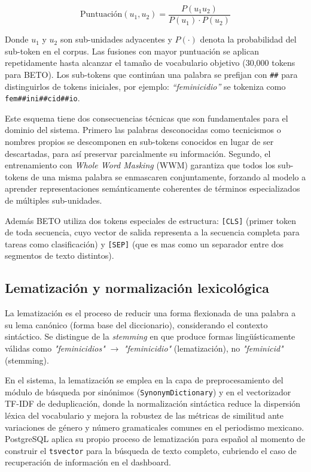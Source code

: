 \begin{equation}
    \text{Puntuación}(u_1, u_2) = \frac{P(u_1 u_2)}{P(u_1) \cdot P(u_2)}
\end{equation}

Donde $u_1$ y $u_2$ son sub-unidades adyacentes y $P(\cdot)$ denota la probabilidad
del sub-token en el corpus. Las fusiones con mayor puntuación se aplican repetidamente
hasta alcanzar el tamaño de vocabulario objetivo (30{,}000 tokens para BETO). Los sub-tokens
que continúan una palabra se prefijan con \texttt{\#\#} para distinguirlos de tokens iniciales,
por ejemplo: \textit{``feminicidio''} se tokeniza como \texttt{fem\#\#ini\#\#cid\#\#io}.

Este esquema tiene dos consecuencias técnicas que son fundamentales para el dominio del
sistema. Primero las palabras desconocidas como tecnicismos o nombres propios se
descomponen en sub-tokens conocidos en lugar de ser descartadas, para así preservar
parcialmente su información. Segundo, el entrenamiento con \textit{Whole Word Masking}
(WWM) garantiza que todos los sub-tokens de una misma palabra se enmascaren conjuntamente,
forzando al modelo a aprender representaciones semánticamente coherentes de términos
especializados de múltiples sub-unidades. 

Además BETO utiliza dos tokens especiales de estructura: \texttt{[CLS]} (primer
token de toda secuencia, cuyo vector de salida representa a la secuencia completa
para tareas como clasificación) y \texttt{[SEP]} (que es mas como un separador entre
dos segmentos de texto distintos).


\subsection{Lematización y normalización lexicológica}
\label{subsec:mt_lematizacion}


La lematización es el proceso de reducir una forma flexionada de una palabra a su
lema canónico (forma base del diccionario), considerando el contexto sintáctico.
Se distingue de la \textit{stemming} en que produce formas lingüísticamente válidas como
\textit{"feminicidios"} $\rightarrow$ \textit{"feminicidio"} (lematización),
no \textit{"feminicid"} (stemming).

En el sistema, la lematización se emplea en la capa de preprocesamiento del módulo
de búsqueda por sinónimos (\texttt{SynonymDictionary}) y en el vectorizador TF-IDF
de deduplicación, donde la normalización sintáctica reduce la dispersión léxica
del vocabulario y mejora la robustez de las métricas de similitud ante variaciones
de género y número gramaticales comunes en el periodismo mexicano.
PostgreSQL aplica su propio proceso de lematización para español al momento de
construir el \texttt{tsvector} para la búsqueda de texto completo, cubriendo el caso
de recuperación de información en el dashboard.



